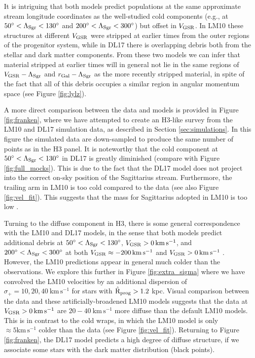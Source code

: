 \documentclass[twocolumn,tighten,twocolappendix]{aastex63}
\newcommand{\sgr}{Sagittarius}
\newcommand{\kms}{\mathrm{km} \, \mathrm{s}^{-1}}
\newcommand{\Vgsr}{V_{\rm GSR}}
\begin{document}
\begin{CJK*}{UTF8}{gbsn}
It is intriguing that both models predict populations at the same approximate stream longitude coordinates as the well-studied cold components (e.g., at $50^\circ<\Lambda_{\rm Sgr}<130^\circ$ and $200^\circ<\Lambda_{\rm Sgr}<300^\circ$) but offset in $\Vgsr$.  In LM10 these structures at different $\Vgsr$ were stripped at earlier times from the outer regions of the progenitor system, while in DL17 there is overlapping debris both from the stellar and dark matter components.  From these two models we can infer that material stripped at earlier times will in general not lie in the same regions of $\Vgsr-\Lambda_{\rm Sgr}$ and $r_{\rm Gal}-\Lambda_{\rm Sgr}$ as the more recently stripped material, in spite of the fact that all of this debris occupies a similar region in angular momentum space (see Figure \ref{fig:lylz}).

A more direct comparison between the data and models is provided in Figure \ref{fig:franken}, where we have attempted to create an H3-like survey from the LM10 and DL17 simulation data, as described in Section \ref{sec:simulations}.  In this figure the simulated data are down-sampled to produce the same number of points as in the H3 panel.  It is noteworthy that the cold component at $50^\circ<\Lambda_{\rm Sgr}<130^\circ$ in DL17 is greatly diminished (compare with Figure \ref{fig:full_mocks}).  This is due to the fact that the DL17 model does not project into the correct on-sky position of the \sgr{} stream.  Furthermore, the trailing arm in LM10 is too cold compared to the data (see also Figure \ref{fig:vel_fit}).  This suggests that the mass for \sgr{} adopted in LM10 is too low \citep[see also][]{Gibbons17}.

Turning to the diffuse component in H3, there is some general correspondence with the LM10 and DL17 models, in the sense that both models predict additional debris at $50^\circ<\Lambda_{\rm Sgr}<130^\circ$, $\Vgsr>0\,\kms$, and $200^\circ<\Lambda_{\rm Sgr}<300^\circ$ at both $\Vgsr\approx-200\,\kms$ and $\Vgsr>0\,\kms$ \citep[see also][]{Yang19}.  However, the LM10 predictions appear in general much colder than the observations.  We explore this further in Figure \ref{fig:extra_sigma} where we have convolved the LM10 velocities by an additional dispersion of $\sigma_+=10,20,40\ \kms$ for stars with $\hat{\rm R}_{\rm prog}>1.2$ kpc.  Visual comparison between the data and these artificially-broadened LM10 models suggests that the data at $\Vgsr>0\,\kms$ are $20-40\ \kms$ more diffuse than the default LM10 models.  This is in contrast to the cold wraps, in which the LM10 model is only $\approx5\kms$ colder than the data (see Figure \ref{fig:vel_fit}).  Returning to Figure \ref{fig:franken}, the DL17 model predicts a high degree of diffuse structure, if we associate some stars with the dark matter distribution (black points).


\end{CJK*}
\end{document}
